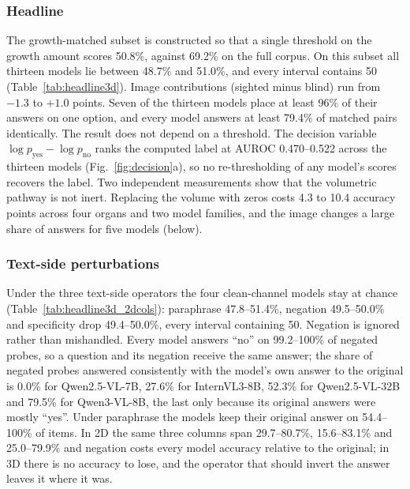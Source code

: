 \subsubsection{Headline} The growth-matched subset is constructed so that a single
threshold on the growth amount scores 50.8\%, against 69.2\% on the full
corpus. On this subset all thirteen models lie between 48.7\% and 51.0\%,
and every interval contains 50 (Table~\ref{tab:headline3d}). Image
contributions (sighted minus blind) run from $-1.3$ to $+1.0$ points. Seven
of the thirteen models place at least 96\% of their answers on one option,
and every model answers at least 79.4\% of matched pairs identically. The
result does not depend on a threshold. The decision variable
$\log p_{\text{yes}}-\log p_{\text{no}}$ ranks the computed label at AUROC
0.470--0.522 across the thirteen models (Fig.~\ref{fig:decision}a), so no
re-thresholding of any model's scores recovers the label. Two independent
measurements show that the volumetric pathway is not inert. Replacing the
volume with zeros costs 4.3 to 10.4 accuracy points across four organs and
two model families, and the image changes a large share of answers for five
models (below).

\subsubsection{Text-side perturbations} Under the three text-side operators
the four clean-channel models stay at chance
(Table~\ref{tab:headline3d_2dcols}): paraphrase 47.8--51.4\%, negation
49.5--50.0\% and specificity drop 49.4--50.0\%, every interval containing 50.
Negation is ignored rather than mishandled. Every model answers ``no'' on
99.2--100\% of negated probes, so a question and its negation receive the
same answer; the share of negated probes answered consistently with the
model's own answer to the original is 0.0\% for Qwen2.5-VL-7B, 27.6\% for
InternVL3-8B, 52.3\% for Qwen2.5-VL-32B and 79.5\% for Qwen3-VL-8B, the last
only because its original answers were mostly ``yes''. Under paraphrase the
models keep their original answer on 54.4--100\% of items. In 2D the same
three columns span 29.7--80.7\%, 15.6--83.1\% and 25.0--79.9\% and negation
costs every model accuracy relative to the original; in 3D there is no
accuracy to lose, and the operator that should invert the answer leaves it
where it was.

